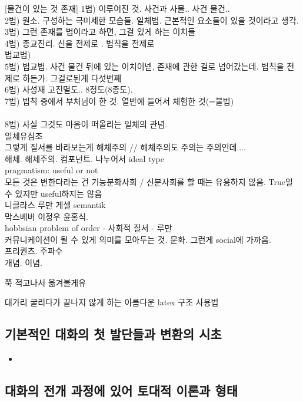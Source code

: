 \documentclass[11pt, a4paper]{article}
\begin{document}
[물건이 있는 것 존재]
1법) 이루어진 것. 사건과 사물.. 사건 물건.. \\
2법) 원소. 구성하는 극미세한 모습들. 일체법. 근본적인 요소들이 있을 것이라고 생각.\\
3법) 그런 존재를 법이라고 하면, 그걸 있게 하는 이치들\\
4법) 종교진리. 신을 전제로 . 법칙을 전제로\\
법교법) \\
5법) 법교법. 사건 물건 뒤에 있는 이치이넫, 존재에 관한 걸로 넘어갔는데. 법칙을 전제로 하든가. 그걸로된게 다섯번째\\
6법) 사성재 고진멸도.. 8정도(8종도). \\
7법) 법칙 중에서 부처님이 한 것. 열반에 들어서 체험한 것(=불법)\\
[우리가 아는 것이 마음에 다 있다]\\
8법) 사실 그것도 마음이 떠올리는 일체의 관념. \\
일체유심조\\
그렇게 질서를 바라보는게 해체주의 // 해체주의도 주의는 주의인데.... \\
해체. 해체주의. 컴포넌트. 나누어서 ideal type\\
pragmatism: useful or not\\
모든 것은 변한다라는 건 기능분화사회 / 신분사회를 할 때는 유용하지 않음. True일 수 있지만 useful하지는 않음\\
니클라스 루만 게셀 semantik\\
막스베버 이정우 윤홍식.\\
hobbsian problem of order - 사회적 질서 - 루만\\
커뮤니케이션이 될 수 있게 의미를 모아두는 것. 문화. 그런게 social에 가까움.\\

프리퀀츠. 주파수 \\
개념. 이념. 

쭉 적고나서 옮겨볼게유

대가리 굴리다가 끝나지 않게 하는 아름다운 latex 구조 사용법 ~

\subsection{기본적인 대화의 첫 발단들과 변환의 시초}
\begin{itemize}
    \item 
\end{itemize}

\subsection{대화의 전개 과정에 있어 토대적 이론과 형태}
\end{document}

